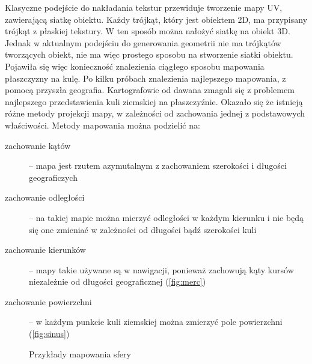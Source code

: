 Klasyczne podejście do nakładania tekstur przewiduje tworzenie mapy UV, zawierającą siatkę obiektu. Każdy trójkąt, który jest obiektem 2D, ma przypisany trójkąt z płaskiej tekstury. W ten sposób można nałożyć siatkę na obiekt 3D. Jednak w aktualnym podejściu do generowania geometrii nie ma trójkątów tworzących obiekt, nie ma więc prostego sposobu na stworzenie siatki obiektu. Pojawiła się więc konieczność znalezienia ciągłego sposobu mapowania płaszczyzny na kulę. Po kilku próbach znalezienia najlepszego mapowania, z pomocą przyszła geografia. Kartografowie od dawana zmagali się z problemem najlepszego przedstawienia kuli ziemskiej na płaszczyźnie. Okazało się że istnieją różne metody projekcji mapy, w zależności od zachowania jednej z podstawowych właściwości. Metody mapowania można podzielić na:
\begin{description}
\item[zachowanie kątów] -- mapa jest rzutem azymutalnym z zachowaniem szerokości i długości geograficzych
\item[zachowanie odległości] -- na takiej mapie można mierzyć odległości w każdym kierunku i nie będą się one zmieniać w zależności od długości bądź szerokości kuli
\item[zachowanie kierunków] -- mapy takie używane są w nawigacji, ponieważ zachowują kąty kursów niezależnie od długości geograficznej (\hyperref[fig:merc]{\ref{fig:merc}})
\item[zachowanie powierzchni] -- w każdym punkcie kuli ziemskiej można zmierzyć pole powierzchni (\hyperref[fig:sinus]{\ref{fig:sinus}})
\end{description}

\begin{figure}
\centering
	 \hspace{.0\textwidth}
\caption{Przykłady mapowania sfery}
\label{fig:project}
\end{figure}

